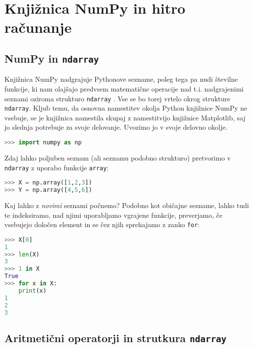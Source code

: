\chapter{Knjižnica NumPy in hitro računanje}

\section{NumPy in \texttt{ndarray}}

Knjižnica NumPy nadgrajuje Pythonove sezname, poleg tega pa nudi številne funkcije, ki nam olajšajo predvsem matematične operacije nad t.i. nadgrajenimi seznami oziroma strukturo \texttt{ndarray} . Vse se bo torej vrtelo okrog strukture \texttt{ndarray}. Kljub temu, da osnovna namestitev okolja Python knjižnice NumPy ne vsebuje, se je knjižnica namestila skupaj z namestitvijo knjižnice Matplotlib, saj jo slednja potrebuje za svoje delovanje. Uvozimo jo v svoje delovno okolje.
\begin{lstlisting}[language=Python]
>>> import numpy as np
\end{lstlisting}
Zdaj lahko poljuben seznam (ali seznamu podobno strukturo) pretvorimo v \texttt{ndarray} z uporabo funkcije \texttt{array}:
\begin{lstlisting}[language=Python]
>>> X = np.array([1,2,3])
>>> Y = np.array([4,5,6])
\end{lstlisting}
Kaj lahko z \emph{novimi} seznami počnemo? Podobno kot običajne sezname, lahko tudi te indeksiramo, nad njimi uporabljamo vgrajene funkcije, preverjamo, če vsebujejo določen element in se čez njih sprehajamo z zanko \texttt{for}:
\begin{lstlisting}[language=Python]
>>> X[0]
1
>>> len(X)
3
>>> 1 in X
True
>>> for x in X:
	print(x)
1
2
3
\end{lstlisting}

\section{Aritmetični operatorji in strutkura \texttt{ndarray}}

